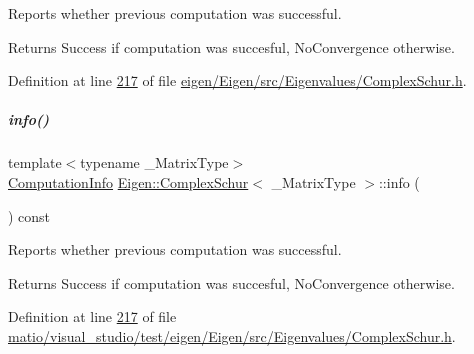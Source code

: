 Reports whether previous computation was successful. 

\begin{DoxyReturn}{Returns}
{\ttfamily Success} if computation was succesful, {\ttfamily No\+Convergence} otherwise. 
\end{DoxyReturn}


Definition at line \hyperlink{eigen_2_eigen_2src_2_eigenvalues_2_complex_schur_8h_source_l00217}{217} of file \hyperlink{eigen_2_eigen_2src_2_eigenvalues_2_complex_schur_8h_source}{eigen/\+Eigen/src/\+Eigenvalues/\+Complex\+Schur.\+h}.

\mbox{\label{group___eigenvalues___module_a8c5ee15fecfd126fc362c3f2fd28f51e}} 
\subparagraph{\texorpdfstring{info()}{info()}\hspace{0.1cm}{\footnotesize\ttfamily [2/2]}}
{\footnotesize\ttfamily template$<$typename \+\_\+\+Matrix\+Type$>$ \\
\hyperlink{group__enums_ga85fad7b87587764e5cf6b513a9e0ee5e}{Computation\+Info} \hyperlink{group___eigenvalues___module_class_eigen_1_1_complex_schur}{Eigen\+::\+Complex\+Schur}$<$ \+\_\+\+Matrix\+Type $>$\+::info (\begin{DoxyParamCaption}{ }\end{DoxyParamCaption}) const\hspace{0.3cm}{\ttfamily [inline]}}



Reports whether previous computation was successful. 

\begin{DoxyReturn}{Returns}
{\ttfamily Success} if computation was succesful, {\ttfamily No\+Convergence} otherwise. 
\end{DoxyReturn}


Definition at line \hyperlink{matio_2visual__studio_2test_2eigen_2_eigen_2src_2_eigenvalues_2_complex_schur_8h_source_l00217}{217} of file \hyperlink{matio_2visual__studio_2test_2eigen_2_eigen_2src_2_eigenvalues_2_complex_schur_8h_source}{matio/visual\+\_\+studio/test/eigen/\+Eigen/src/\+Eigenvalues/\+Complex\+Schur.\+h}.

